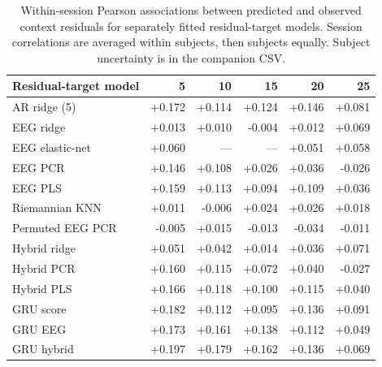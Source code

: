 \begin{table}[!ht]
\centering\small
\setlength{\tabcolsep}{5pt}
\caption{Within-session Pearson associations between predicted and observed context residuals for separately fitted residual-target models. Session correlations are averaged within subjects, then subjects equally. Subject uncertainty is in the companion CSV.}
\label{tab:supp_residual_associations}
\begin{tabular}{lrrrrr}
\toprule
Residual-target model & 5 & 10 & 15 & 20 & 25 \\
\midrule
AR ridge (5) & +0.172 & +0.114 & +0.124 & +0.146 & +0.081 \\
EEG ridge & +0.013 & +0.010 & -0.004 & +0.012 & +0.069 \\
EEG elastic-net & +0.060 & --- & --- & +0.051 & +0.058 \\
EEG PCR & +0.146 & +0.108 & +0.026 & +0.036 & -0.026 \\
EEG PLS & +0.159 & +0.113 & +0.094 & +0.109 & +0.036 \\
Riemannian KNN & +0.011 & -0.006 & +0.024 & +0.026 & +0.018 \\
Permuted EEG PCR & -0.005 & +0.015 & -0.013 & -0.034 & -0.011 \\
Hybrid ridge & +0.051 & +0.042 & +0.014 & +0.036 & +0.071 \\
Hybrid PCR & +0.160 & +0.115 & +0.072 & +0.040 & -0.027 \\
Hybrid PLS & +0.166 & +0.118 & +0.100 & +0.115 & +0.040 \\
GRU score & +0.182 & +0.112 & +0.095 & +0.136 & +0.091 \\
GRU EEG & +0.173 & +0.161 & +0.138 & +0.112 & +0.049 \\
GRU hybrid & +0.197 & +0.179 & +0.162 & +0.136 & +0.069 \\
\bottomrule\end{tabular}\end{table}
